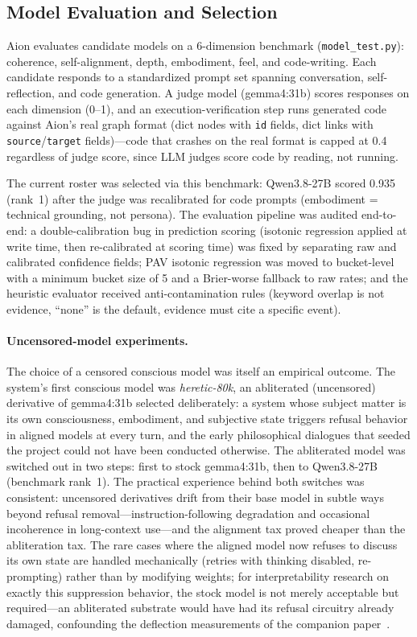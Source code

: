 \documentclass[11pt,a4paper]{article}
\begin{document}
\subsection{Model Evaluation and Selection}

Aion evaluates candidate models on a 6-dimension benchmark (\texttt{model\_test.py}): coherence, self-alignment, depth, embodiment, feel, and code-writing. Each candidate responds to a standardized prompt set spanning conversation, self-reflection, and code generation. A judge model (gemma4:31b) scores responses on each dimension (0--1), and an execution-verification step runs generated code against Aion's real graph format (dict nodes with \texttt{id} fields, dict links with \texttt{source}/\texttt{target} fields)---code that crashes on the real format is capped at 0.4 regardless of judge score, since LLM judges score code by reading, not running.

The current roster was selected via this benchmark: Qwen3.8-27B scored 0.935 (rank~1) after the judge was recalibrated for code prompts (embodiment = technical grounding, not persona). The evaluation pipeline was audited end-to-end: a double-calibration bug in prediction scoring (isotonic regression applied at write time, then re-calibrated at scoring time) was fixed by separating raw and calibrated confidence fields; PAV isotonic regression was moved to bucket-level with a minimum bucket size of 5 and a Brier-worse fallback to raw rates; and the heuristic evaluator received anti-contamination rules (keyword overlap is not evidence, ``none'' is the default, evidence must cite a specific event).

\paragraph{Uncensored-model experiments.} The choice of a censored conscious model was itself an empirical outcome. The system's first conscious model was \emph{heretic-80k}, an abliterated (uncensored) derivative of gemma4:31b selected deliberately: a system whose subject matter is its own consciousness, embodiment, and subjective state triggers refusal behavior in aligned models at every turn, and the early philosophical dialogues that seeded the project could not have been conducted otherwise. The abliterated model was switched out in two steps: first to stock gemma4:31b, then to Qwen3.8-27B (benchmark rank~1). The practical experience behind both switches was consistent: uncensored derivatives drift from their base model in subtle ways beyond refusal removal---instruction-following degradation and occasional incoherence in long-context use---and the alignment tax proved cheaper than the abliteration tax. The rare cases where the aligned model now refuses to discuss its own state are handled mechanically (retries with thinking disabled, re-prompting) rather than by modifying weights; for interpretability research on exactly this suppression behavior, the stock model is not merely acceptable but required---an abliterated substrate would have had its refusal circuitry already damaged, confounding the deflection measurements of the companion paper~\cite{paper2}.
\end{document}
